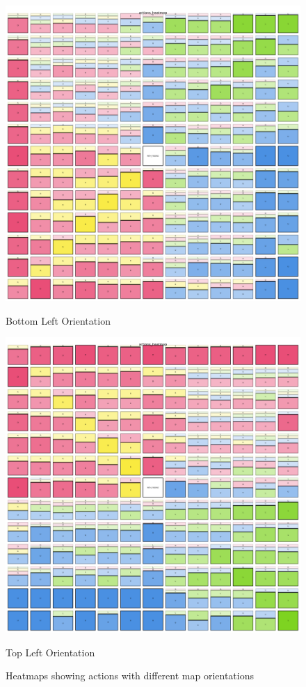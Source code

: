 \begin{figure}[h]
  \centering
  \begin{minipage}[b]{0.45\textwidth}
    \centering
    \includegraphics[width=\textwidth]{
      images/results_discussion/actions_heatmapBL.png
    }
    \caption{Bottom Left Orientation}
    \label{fig:heatmapBL}
  \end{minipage}
  \hfill
  \begin{minipage}[b]{0.45\textwidth}
    \centering
    \includegraphics[width=\textwidth]{
      images/results_discussion/actions_heatmapTL.png
    }
    \caption{Top Left Orientation}
    \label{fig:heatmapTL}
  \end{minipage}
  \caption{Heatmaps showing actions with different map orientations}
  \label{fig:orientation}
\end{figure}

